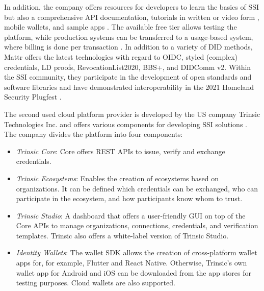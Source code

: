     In addition, the company offers resources for developers to learn the basics of SSI \cite{Mattr_resources_2021} but also a comprehensive API documentation, tutorials in written or video form \cite{Mattr_Mattr_2021}, mobile wallets, and sample apps \cite{Mattr_Mattr_2021-1, Mattr_vii_2021}. The available free tier allows testing the platform, while production systems can be transferred to a usage-based system, where billing is done per transaction \cite{Mattr_Mattr_2021-3}. In addition to a variety of \ac{DID} methods, Mattr offers the latest technologies with regard to \ac{OIDC}, styled (complex) credentials, LD proofs, RevocationList2020, BBS+, and DIDComm v2. Within the \ac{SSI} community, they participate in the development of open standards \cite{Mattr_approach_2021, looker_bbs_2021} and software libraries \cite{Mattr_Mattr_2021-5} and have demonstrated interoperability in the 2021 Homeland Security Plugfest  \cite{homeland_security_interoperability_2021}.
    
    The second used cloud platform provider is developed by the US company Trinsic Technologies Inc. and offers various components for developing SSI solutions \cite{trinsic_trinsic_2021}. The company divides the platform into four components:
    
    \begin{itemize}
        \item \textit{Trinsic Core}: Core offers REST APIs to issue, verify and exchange credentials. \cite{trinsic_trinsic_2021-1}
        \item \textit{Trinsic Ecosystems}: Enables the creation of ecosystems based on organizations. It can be defined which credentials can be exchanged, who can participate in the ecosystem, and how participants know whom to trust. \cite{trinsic_trinsic_2021-2}
        \item \textit{Trinsic Studio}: A dashboard that offers a user-friendly GUI on top of the Core APIs to manage organizations, connections, credentials, and verification templates. Trinsic also offers a white-label version of Trinsic Studio. \cite{trinsic_trinsic_2021-3}
        \item \textit{Identity Wallets}: The wallet SDK allows the creation of cross-platform wallet apps for, for example, Flutter and React Native. Otherwise, Trinsic's own wallet app for Android and iOS can be downloaded from the app stores for testing purposes. Cloud wallets are also supported. \cite{trinsic_identity_2021}
    \end{itemize}
    
